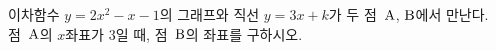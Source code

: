 이차함수 $y=2x^2-x-1$의 그래프와 직선 $y=3x+k$가 두 점~$\mathrm{A}$, $\mathrm{B}$에서 만난다. 점~$\mathrm{A}$의 $x$좌표가 $3$일 때, 점~$\mathrm{B}$의 좌표를 구하시오. 
